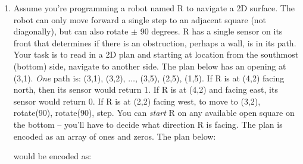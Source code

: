 \documentclass{article}
\begin{document}
\begin{enumerate}
\item Assume you're programming a robot named \textsf{R} to navigate a 2D surface.  The robot can only move forward a single step to an adjacent square (not diagonally), but can also rotate $\pm$ 90 degrees.  \textsf{R} has a single sensor on its front that determines if there is an obstruction, perhaps a wall, is in its path.  Your task is to read in a 2D plan and starting at location from the southmost (bottom) side, navigate to another side.  The plan below has an opening at (3,1).  {\it One} path is: (3,1), (3,2), $\ldots$, (3,5), (2,5), (1,5).  If \textsf{R} is at (4,2) facing north, then its sensor would return 1.  If \textsf{R} is at (4,2) and facing east, its sensor would return 0.  If \textsf{R} is at (2,2) facing west, to move to (3,2), rotate(90), rotate(90), step.  You can {\it start} \textsf{R} on any available open square on the bottom -- you'll have to decide what direction \textsf{R} is facing.  The plan is encoded as an array of ones and zeros.  The plan below:

\begin{center}
{\small
{}}
\end{center}

would be encoded as:


\end{enumerate}
\end{document}
